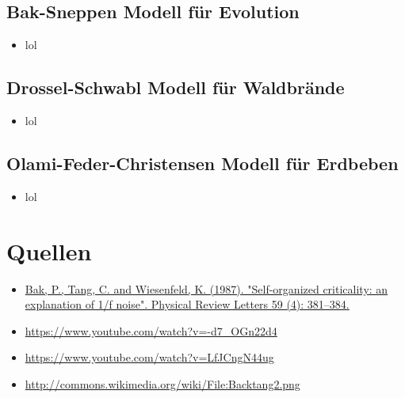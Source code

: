 \documentclass{beamer}
\begin{document}
\subsection{Bak-Sneppen Modell für Evolution}
\begin{frame}{\insertsection}{\insertsubsection}
	\begin{itemize}
        \item lol
	\end{itemize}
\end{frame}

\subsection{Drossel-Schwabl Modell für Waldbrände}
\begin{frame}{\insertsection}{\insertsubsection}
	\begin{itemize}
        \item lol
	\end{itemize}
\end{frame}

\subsection{Olami-Feder-Christensen Modell für Erdbeben}
\begin{frame}{\insertsection}{\insertsubsection}
	\begin{itemize}
        \item lol
	\end{itemize}
\end{frame}

\section{Quellen}
\begin{frame}{\insertsection}{\insertsubsection}
	\begin{itemize}
        \tiny
        \item \url{Bak, P., Tang, C. and Wiesenfeld, K. (1987). "Self-organized criticality: an
            explanation of 1/f noise". Physical Review Letters 59 (4): 381–384.}
        \item \url{https://www.youtube.com/watch?v=-d7\_OGn22d4}
        \item \url{https://www.youtube.com/watch?v=LfJCngN44ug}
        \item \url{http://commons.wikimedia.org/wiki/File:Backtang2.png}
	\end{itemize}
\end{frame}
\end{document}
